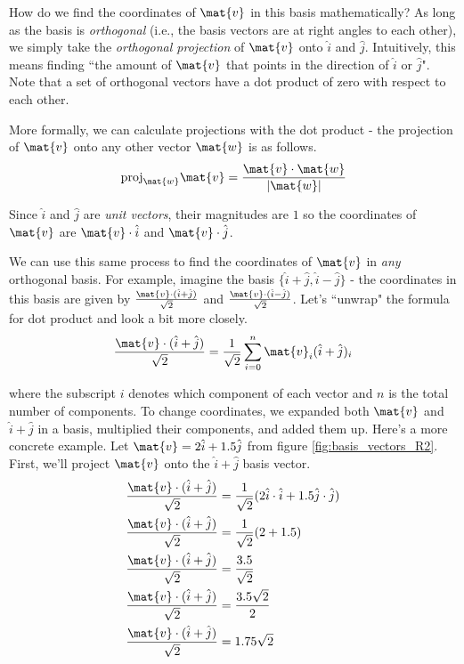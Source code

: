 How do we find the coordinates of $\mat{v}$ in this basis mathematically? As
long as the basis is \textit{orthogonal} (i.e., the basis vectors are at right
angles to each other), we simply take the \textit{orthogonal projection} of
$\mat{v}$ onto $\hat{i}$ and $\hat{j}$. Intuitively, this means finding ``the
amount of $\mat{v}$ that points in the direction of $\hat{i}$ or $\hat{j}$".
Note that a set of orthogonal vectors have a dot product of zero with respect to
each other.

More formally, we can calculate projections with the dot product - the
projection of $\mat{v}$ onto any other vector $\mat{w}$ is as follows.
\begin{equation*}
  \text{proj}_\mat{w} \mat{v} = \frac{\mat{v} \cdot \mat{w}}{|\mat{w}|}
\end{equation*}

Since $\hat{i}$ and $\hat{j}$ are \textit{unit vectors}, their magnitudes are
$1$ so the coordinates of $\mat{v}$ are $\mat{v} \cdot \hat{i}$ and
$\mat{v} \cdot \hat{j}$.

We can use this same process to find the coordinates of $\mat{v}$ in
\textit{any} orthogonal basis. For example, imagine the basis
$\{\hat{i} + \hat{j}, \hat{i} - \hat{j}\}$ - the coordinates in this basis are
given by $\frac{\mat{v} \cdot (\hat{i} + \hat{j})}{\sqrt{2}}$ and
$\frac{\mat{v} \cdot (\hat{i} - \hat{j})}{\sqrt{2}}$. Let's ``unwrap" the
formula for dot product and look a bit more closely.
\begin{equation*}
  \frac{\mat{v} \cdot (\hat{i} + \hat{j})}{\sqrt{2}} =
    \frac{1}{\sqrt{2}} \sum_{i=0}^n \mat{v}_i (\hat{i} + \hat{j})_i
\end{equation*}

where the subscript $i$ denotes which component of each vector and $n$ is the
total number of components. To change coordinates, we expanded both $\mat{v}$
and $\hat{i} + \hat{j}$ in a basis, multiplied their components, and added them
up. Here's a more concrete example. Let $\mat{v} = 2\hat{i} + 1.5\hat{j}$ from
figure \ref{fig:basis_vectors_R2}. First, we'll project $\mat{v}$ onto the
$\hat{i} + \hat{j}$ basis vector.
\begin{align*}
  \frac{\mat{v} \cdot (\hat{i} + \hat{j})}{\sqrt{2}} &=
    \frac{1}{\sqrt{2}} (2\hat{i} \cdot \hat{i} + 1.5\hat{j} \cdot \hat{j}) \\
  \frac{\mat{v} \cdot (\hat{i} + \hat{j})}{\sqrt{2}} &=
    \frac{1}{\sqrt{2}} (2 + 1.5) \\
  \frac{\mat{v} \cdot (\hat{i} + \hat{j})}{\sqrt{2}} &= \frac{3.5}{\sqrt{2}} \\
  \frac{\mat{v} \cdot (\hat{i} + \hat{j})}{\sqrt{2}} &= \frac{3.5\sqrt{2}}{2} \\
  \frac{\mat{v} \cdot (\hat{i} + \hat{j})}{\sqrt{2}} &= 1.75\sqrt{2}
\end{align*}

